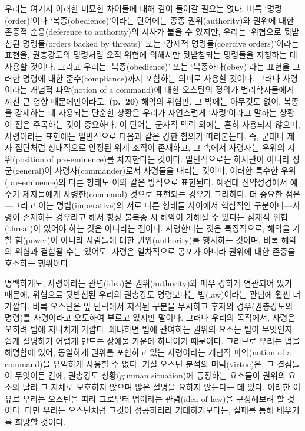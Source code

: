 우리는 여기서 이러한 미묘한 차이들에 대해 깊이 들어갈 필요는 없다. 비록
‘명령(order)’이나 ‘복종(obedience)’이라는 단어에는 종종
권위(authority)와 권위에 대한 존중적 순응(deference to authority)의
시사가 붙을 수 있지만, 우리는 ‘위협으로 뒷받침된 명령들(orders backed by
threats)’ 또는 ‘강제적 명령들(coercive orders)’이라는 표현을, 권총강도의
명령처럼 오직 위협에 의해서만 뒷받침되는 명령들을 지칭하는 데 사용할
것이다. 그리고 우리는 ‘복종(obedience)’ 또는 ‘복종하다(obey)’라는 표현을
그러한 명령에 대한 준수(compliance)까지 포함하는 의미로 사용할 것이다.
그러나 사령이라는 개념적 파악(notion of a command)에 대한 오스틴의
정의가 법리학자들에게 끼친 큰 영향 때문에만이라도, \textbf{(p.~20)}
해악의 위협만, 그 밖에는 아무것도 없이, 복종을 강제하는 데 사용되는
단순한 상황은 우리가 자연스럽게 ‘사령’이라고 말하는 상황이
 점은 주목하는 것이 중요하다. 이 단어는 군사적 맥락
외에는 흔히 사용되지 않으며, 사령이라는 표현에는 일반적으로 다음과 같은
강한 함의가 따라붙는다. 즉, 군대나 제자 집단처럼 상대적으로 안정된 위계
조직이 존재하고, 그 속에서 사령자는 우위의 지위(position of
pre-eminence)를 차지한다는 것이다. 일반적으로는 하사관이 아니라
장군(general)이 사령자(commander)로서 사령들을 내리는 것이며, 이러한
특수한 우위(pre-eminence)의 다른 형태도 이와 같은 방식으로 표현된다.
예컨대 신약성경에서 예수가 제자들에게 사령한(command) 것으로 표현되는
경우가 그러하다. 더 중요한 점은---그리고 이는 명법(imperative)의 서로
다른 형태들 사이에서 핵심적인 구분이다---사령이 존재하는 경우라고 해서
항상 불복종 시 해악이 가해질 수 있다는 잠재적 위협(threat)이 있어야 하는
것은 아니라는 점이다. 사령한다는 것은 특징적으로, 해악을 가할
힘(power)이 아니라 사람들에 대한 권위(authority)를 행사하는 것이며, 비록
해악의 위협과 결합될 수는 있어도, 사령은 일차적으로 공포가 아니라 권위에
대한 존중을 호소하는 행위이다.

명백하게도, 사령이라는 관념(idea)은 권위(authority)와 매우 강하게
연관되어 있기 때문에, 위협으로 뒷받침된 우리의 권총강도 명령보다는
법(law)이라는 관념에 훨씬 더 가깝다. 비록 오스틴은 앞 단락에서 지적된
구분을 무시하고 후자의 경우(권총강도의 명령)를 사령이라고 오도하여
부르고 있지만 말이다. 그러나 우리의 목적에서, 사령은 오히려 법에
지나치게 가깝다. 왜냐하면 법에 관여하는 권위의 요소는 법이 무엇인지 쉽게
설명하기 어렵게 만드는 장애물 가운데 하나이기 때문이다. 그러므로 우리는
법을 해명함에 있어, 동일하게 권위를 포함하고 있는 사령이라는 개념적
파악(notion of a command)을 유익하게 사용할 수 없다. 기실 오스틴 분석의
미덕(virtue)은, 그 결점들이 무엇이든 간에, 권총강도 상황(gunman
situation)에 등장하는 요소들이 권위의 요소와 달리 그 자체로 모호하지
않으며 많은 설명을 요하지 않는다는 데 있다. 이러한 이유로 우리는
오스틴을 따라 그로부터 법이라는 관념(idea of law)을 구성해보려 할
것이다. 다만 우리는 오스틴처럼 그것이 성공하리라 기대하기보다는, 실패를
통해 배우기를 희망할 것이다.

